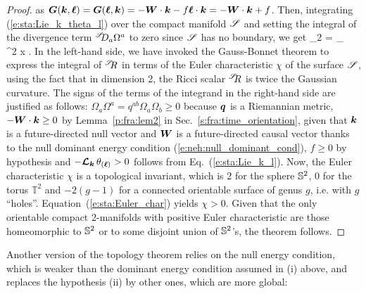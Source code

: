 \begin{proof}
as $\bm{G}(\bm{k},\bm{\ell}) = \bm{G}(\bm{\ell}, \bm{k}) = - \bm{W}\cdot\bm{k} - f \bm{\ell}\cdot \bm{k} = - \bm{W}\cdot\bm{k} + f$.
Then, integrating (\ref{e:sta:Lie_k_theta_l}) over the compact manifold $\mathscr{S}$
and setting the integral of the divergence term ${}^{\mathscr{S}}\!\!D_a \Omega^a$ to zero since
$\mathscr{S}$ has no boundary, we get
\be \label{e:sta:Euler_char}
    _{2\pi\chi} = \int_\Sp {}
           \, \D^2 x .
\ee
In the left-hand side, we have invoked the Gauss-Bonnet theorem
to express the integral of ${}^{\mathscr{S}}\!\! R$ in terms
of the Euler characteristic $\chi$ of the
surface $\mathscr{S}$, using the fact that in dimension 2,
the Ricci scalar ${}^{\mathscr{S}}\!\! R$ is twice the
Gaussian curvature.
The signs of the terms of the integrand in the right-hand side
are justified as follows:
$\Omega_a \Omega^a = q^{ab} \Omega_a \Omega_b \geq 0$ because $\bm{q}$ is a Riemannian metric,
$- \bm{W}\cdot\bm{k} \geq 0$ by Lemma~\ref{p:fra:lem2} in Sec.~\ref{s:fra:time_orientation},
given that $\bm{k}$ is a future-directed null vector and $\bm{W}$ is a future-directed
causal vector thanks to the null dominant energy condition (\ref{e:neh:null_dominant_cond}),
$f\geq 0$ by hypothesis and $- \bm{\mathcal{L}}_{\bm{k}}\, \theta_{(\bm{\ell})} > 0$
follows from Eq.~(\ref{e:sta:Lie_k_l}). Now, the Euler characteristic $\chi$ is a topological
invariant, which is $2$ for the sphere $\mathbb{S}^2$, $0$ for the torus $\mathbb{T}^2$
and $-2(g-1)$
for a connected orientable surface of genus $g$, i.e. with $g$ ``holes''.
Equation~(\ref{e:sta:Euler_char}) yields $\chi > 0$. Given that the only orientable
compact 2-manifolds
with positive Euler characteristic are those homeomorphic to $\mathbb{S}^2$ or
to some disjoint union of $\mathbb{S}^2$'s, the theorem follows.
\end{proof}

Another version of the topology theorem relies on the null energy
condition, which is weaker than the dominant energy condition assumed in (i) above,
and replaces the hypothesis (ii) by other ones, which are more global:

